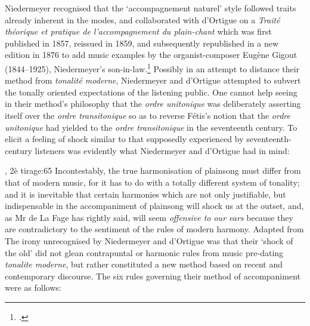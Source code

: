 Niedermeyer recognised that the `accompagnement naturel' style followed traits already inherent in the modes, and collaborated with d'Ortigue on a \textit{Traité théorique et pratique de l'accompagnement du plain-chant} which was first published in 1857, reissued in 1859, and subsequently republished in a new edition in 1876 to add music examples by the organist-composer Eugène Gigout (1844--1925), Niedermeyer's son-in-law.\footcite[19]{GigoutPartiepratique1876}
Possibly in an attempt to distance their method from \emph{tonalité moderne}, Niedermeyer and d'Ortigue attempted to subvert the tonally oriented expectations of the listening public.
One cannot help seeing in their method's philosophy that the \emph{ordre unitonique} was deliberately asserting itself over the \emph{ordre transitonique} so as to reverse Fétis's notion that the \emph{ordre unitonique} had yielded to the \emph{ordre transitonique} in the seventeenth century.
To elicit a feeling of shock similar to that supposedly experienced by seventeenth-century listeners was evidently what Niedermeyer and d'Ortigue had in mind:

  {\cite{NiedermeyerTraitetheoriquepratique1859}, 2è tirage:65}%
{Incontestably, the true harmonisation of plainsong must differ from that of modern music, for it has to do with a totally different system of tonality; \linebreak{}and it is inevitable that certain \linebreak{}harmonies which are not only justifiable, but indispensable in the accompaniment of plainsong will shock us at the outset, and, as Mr de La Fage has rightly said, will seem \emph{offensive to our ears} because they are contradictory to the sentiment of the rules of modern harmony.}
  {Adapted from \cite[38]{NiedermeyerGregorianAccompanimentTheoretical1905}}
\noindent
The irony unrecognised by Niedermeyer and d'Ortigue was that their `shock of the old' did not glean contrapuntal or harmonic rules from music pre-dating \emph{tonalite moderne}, but rather constituted a new method based on recent and contemporary discourse.
The six rules governing their method of accompaniment were as follows:
\pagebreak{}

